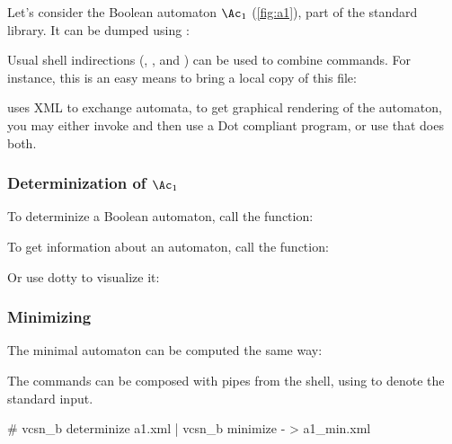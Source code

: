 Let's consider the Boolean automaton $\Ac_1$
(\autoref{fig:a1}), part of the standard library.  It can be dumped
using :


Usual shell indirections (\samp{|}, \samp{>}, and \samp{<}) can be
used to combine \tafkit commands.  For instance, this is an easy means
to bring a local copy of this file:


\tafkit uses XML to exchange automata, to get graphical rendering of
the automaton, you may either invoke  and then
use a Dot compliant program, or use  that does
both.

\begin{center}
\end{center}


\subsubsection{Determinization of $\Ac_1$}
To determinize a Boolean automaton, call the
 function:


To get information about an automaton, call the  function:

Or use dotty to visualize it:
\begin{center}
\end{center}

\subsubsection{Minimizing}

The minimal automaton can be computed the same way:
\begin{center}
\end{center}

The commands can be composed with pipes from the shell, using
\Index{\samp{-}} to denote the standard input.
\begin{shell}
# vcsn_b determinize a1.xml | vcsn_b minimize - > a1_min.xml
\end{shell}


